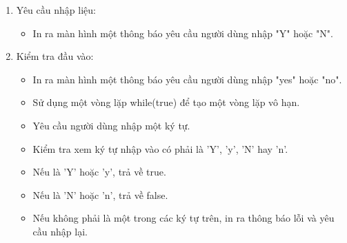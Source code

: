 \documentclass{article}
\begin{document}
\begin{itemize}
\begin{description}
\begin{enumerate}
\begin{itemize}
                \end{itemize}
            \item Yêu cầu nhập liệu:
                \begin{itemize}
                    \item In ra màn hình một thông báo yêu cầu người dùng nhập "Y" hoặc "N".
                \end{itemize}
            \item Kiểm tra đầu vào:
                \begin{itemize}
                    \item In ra màn hình một thông báo yêu cầu người dùng nhập "yes" hoặc "no".
                    \item Sử dụng một vòng lặp while(true) để tạo một vòng lặp vô hạn.
                    \item Yêu cầu người dùng nhập một ký tự.
                    \item Kiểm tra xem ký tự nhập vào có phải là 'Y', 'y', 'N' hay 'n'.
                    \item Nếu là 'Y' hoặc 'y', trả về true.
                    \item Nếu là 'N' hoặc 'n', trả về false.
                    \item Nếu không phải là một trong các ký tự trên, in ra thông báo lỗi và yêu cầu nhập lại.
                \end{itemize} 
        \end{enumerate}
    \end{description}


\end{itemize}
\end{document}
